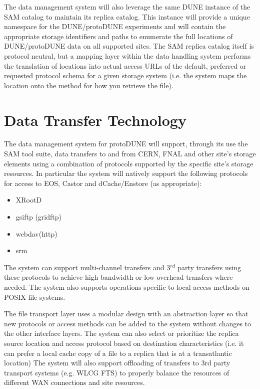 \documentclass[12pt]{article}
\newcommand{\pd}{protoDUNE\xspace}
\begin{document}
{The data management system will also leverage the same DUNE instance of the SAM catalog to maintain its
replica catalog.  This instance will provide a unique namespace for the DUNE/\pd experiments and will
contain the appropriate storage identifiers and paths to enumerate the full locations of  DUNE/\pd data
on all supported sites.  The SAM replica catalog itself is protocol neutral, but a mapping layer within the
data handling system performs the translation of locations into actual access URLs of the default, preferred
or requested protocol schema for a given storage system (i.e. the system maps the location onto the method
for how you retrieve the file).

\section{Data Transfer Technology}

The data management system for \pd will support, through its use the SAM tool suite,  data transfers to and from CERN,
FNAL and other site’s storage elements using a combination of protocols supported by the specific site's storage resources.
In particular the system will natively support the following protocols for access to EOS, Castor and dCache/Enstore (as appropriate):
\begin{itemize}
\item XRootD
\item gsiftp (gridftp)
\item webdav(http)
\item srm
\end{itemize}

\noindent The system can support multi-channel transfers and 3$^{rd}$ party transfers
using these protocols to achieve high bandwidth or low overhead transfers where needed.  The system also supports operations
specific to local access methods on POSIX file systems.  

The file transport layer uses a modular design with an abstraction layer so that new protocols or access methods can be added to the system without changes to the other interface layers.  The system can also select or prioritize the replica source location and access protocol based on destination characteristics (i.e. it can prefer a local cache copy of a file to a replica that is at a transatlantic location)  The system will also support offloading of transfers to 3rd party transport systems (e.g. WLCG FTS) to properly balance the resources of different WAN connections and site resources.

}
\end{document}
